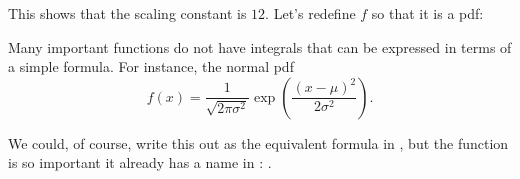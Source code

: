 This shows that the scaling constant is $12$.  Let's redefine $f$ so that it is a pdf:
\begin{knitrout}
\end{knitrout}





Many important functions do not have integrals that can be expressed
in terms of a simple formula.  For instance, the normal pdf 
$$ f(x) = \frac{1}{\sqrt{2 \pi \sigma^2}} \exp\left( \frac{(x - \mu)^2}{2  \sigma^2}\right) .$$

We could, of course, write this out as the equivalent formula in \R,
but the function is so important it already has a name in \R: .

